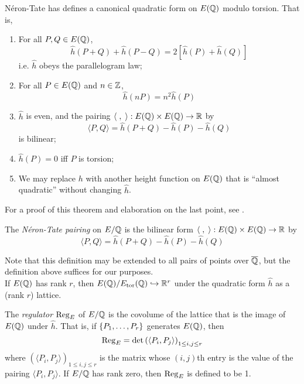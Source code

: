\documentclass[10pt]{article}
\begin{document}
\begin{theorem}
N\'eron-Tate has defines a canonical quadratic form on $E(\mathbb{Q})$ modulo torsion. That is,
\begin{enumerate}
	\item For all $P,Q \in E(\mathbb{Q})$,
	\begin{equation}
		\hat{h}(P+Q) + \hat{h}(P-Q) = 2\left[ \hat{h}(P) + \hat{h}(Q)\right]
	\end{equation}
	i.e. $\hat{h}$ obeys the parallelogram law;
	\item For all $P \in E(\mathbb{Q})$ and $n \in \mathbb{Z}$,
	\begin{equation}
		\hat{h}(nP) = n^2 \hat{h}(P)
	\end{equation}
	\item $\hat{h}$ is even, and the pairing $\langle\;,\;\rangle: E(\mathbb{Q})\times E(\mathbb{Q}) \to \mathbb{R}$ by
	\begin{equation}
		\langle P,Q \rangle = \hat{h}(P+Q) - \hat{h}(P) - \hat{h}(Q)
	\end{equation}
	is bilinear;
	\item $\hat{h}(P) = 0$ iff $P$ is torsion;
	\item We may replace $h$ with another height function on $E(\mathbb{Q})$ that is ``almost quadratic'' without changing $\hat{h}$.
\end{enumerate}
\end{theorem}

For a proof of this theorem and elaboration on the last point, see \cite[pp. 227-232]{Sil-1985}.

\begin{definition}
The {\it N\'eron-Tate pairing} on $E/\mathbb{Q}$ is the bilinear form $\langle\;,\;\rangle: E(\mathbb{Q})\times E(\mathbb{Q}) \to \mathbb{R}$ by
	\begin{equation}
		\langle P,Q \rangle = \hat{h}(P+Q) - \hat{h}(P) - \hat{h}(Q)
	\end{equation}
\end{definition}
Note that this definition may be extended to all pairs of points over $\overline{\mathbb{Q}}$, but the definition above suffices for our purposes. \\

If $E(\mathbb{Q})$ has rank $r$, then $E(\mathbb{Q})/E_{\text{tor}}(\mathbb{Q}) \hookrightarrow \mathbb{R}^r$ under the quadratic form $\hat{h}$ as a (rank $r$) lattice.

\begin{definition}
The {\it regulator} $\operatorname{Reg}_E$ of $E/\mathbb{Q}$ is the covolume of the lattice that is the image of $E(\mathbb{Q})$ under $\hat{h}$. That is, if $\left\{P_1,\ldots,P_r\right\}$ generates $E(\mathbb{Q})$, then
\begin{equation}
	\operatorname{Reg}_E = \det\left(\langle P_i,P_j\rangle \right)_{1 \le i,j \le r}
\end{equation}
where $\left(\langle P_i,P_j\rangle \right)_{1 \le i,j \le r}$ is the matrix whose $(i,j)$th entry is the value of the pairing $\langle P_i,P_j\rangle$. If $E/\mathbb{Q}$ has rank zero, then $\operatorname{Reg}_E$ is defined to be 1.
\end{definition}
\end{document}
